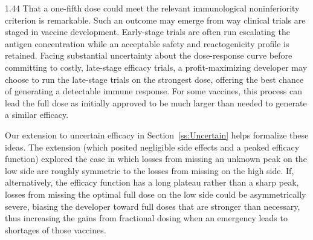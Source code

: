 \documentclass[12pt]{article}
\newcommand{\Section}[1]{\vspace{-8pt}\section{\hskip -1em.~~#1}\vspace{-3pt}}
\begin{document}
\begin{spacing}{1.44}
That a one-fifth dose could meet the relevant immunological noninferiority 
criterion is remarkable. Such an outcome may emerge from way
clinical trials are staged in vaccine development. Early-stage trials
are often run escalating the antigen concentration while an acceptable
safety and reactogenicity profile is retained. Facing substantial
uncertainty about the dose-response curve before committing to costly,
late-stage efficacy trials, a profit-maximizing developer may choose
to run the late-stage trials on the strongest dose, offering the best
chance of generating a detectable immune response. For some vaccines,
this process can lead the full dose as initially approved to be much
larger than needed to generate a similar efficacy.

Our extension to uncertain efficacy in Section~\ref{ss:Uncertain}
helps formalize these ideas. The extension (which posited negligible
side effects and a peaked efficacy function) explored the case in
which losses from missing an unknown peak on the low side are roughly
symmetric to the losses from missing on the high side. If,
alternatively, the efficacy function has a long plateau rather than a
sharp peak, losses from missing the optimal full dose on the low side
could be asymmetrically severe, biasing the developer toward full
doses that are stronger than necessary, thus increasing the gains from
fractional dosing when an emergency leads to shortages of those
vaccines.

\end{spacing}


\clearpage

\setcounter{equation}{0} \setcounter{section}{0}
\setcounter{figure}{0} \setcounter{table}{0}

\renewcommand{\thefigure}{A\arabic{figure}}
\renewcommand{\thetable}{A\arabic{table}}
\renewcommand{\theequation}{A\arabic{equation}}

\renewcommand{\thesection}{A\arabic{section}}
\titleformat{\section}{\normalfont\Large\bfseries}{Appendix~\thesection}{1em}{}
\renewcommand{\Section}[1]{\section{\hskip -1em.~~#1}} 
\end{document}
